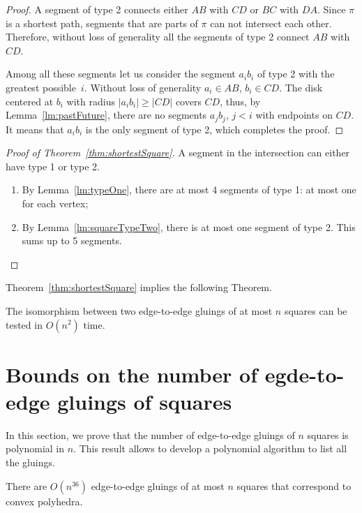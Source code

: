 \documentclass[a4paper,11pt]{article}
\begin{document}
\begin{proof} A segment of type 2 connects either $AB$ with $CD$ or $BC$ with $DA$. Since $\pi$ is a shortest path, segments that are parts of $\pi$ can not intersect each other. Therefore, without loss of generality all the segments of type 2 connect $AB$ with $CD$.
	
	Among all these segments let us consider the segment $a_ib_i$ of type 2 with the greatest possible~$i$. Without loss of generality $a_i \in AB$, $b_i \in CD$. The disk centered at $b_i$ with radius $|a_ib_i| \ge |CD|$ covers $CD$, thus, by Lemma~\ref{lm:pastFuture}, there are no segments $a_jb_j$, $j<i$ with endpoints on $CD$. It means that $a_ib_i$ is the only segment of type 2, which completes the proof.\end{proof}

\begin{proof}[Proof of Theorem~\ref{thm:shortestSquare}]
	A segment in the intersection can either have type 1 or type 2. \begin{enumerate}
	\item By Lemma~\ref{lm:typeOne}, there are at most 4 segments of type 1: at most one for each vertex;
	\item By Lemma~\ref{lm:squareTypeTwo}, there is at most one segment of type 2. This sums up to 5 segments.
\end{enumerate} \end{proof}

Theorem~\ref{thm:shortestSquare} implies the following Theorem.

\begin{theorem} \label{thm:chruntime}
	The isomorphism between two edge-to-edge gluings of at most $n$ squares can be tested in $O(n^2)$ time.
\end{theorem}

\section{Bounds on the number of egde-to-edge gluings of squares}

In this section, we prove that the number of edge-to-edge gluings of $n$ squares is polynomial in $n$. This result allows to develop a polynomial algorithm to list all the gluings.

\begin{theorem} \label{thm:n36}
	There are $O \left( n^{36} \right)$ edge-to-edge gluings of at most $n$ squares that correspond to convex polyhedra.
\end{theorem}
\end{document}
